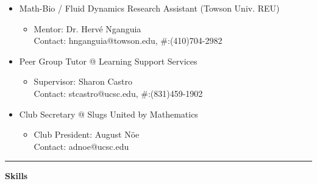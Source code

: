 \documentclass{article}
\begin{document}
{\begin{small}
\begin{itemize}[label = \textcolor{bullets}{}]
    \item{\normalsize Math-Bio / Fluid Dynamics Research Assistant (Towson Univ. REU)}
    \begin{itemize}[label = \textcolor{bullets}{}]
        \item{Mentor: Dr. Herv\'e Nganguia\\ Contact: hnganguia@towson.edu, \#:(410)704-2982}
    \end{itemize}
    \item{\normalsize Peer Group Tutor @ Learning Support Services}
    \begin{itemize}[label = \textcolor{bullets}{}]
        \item{Supervisor: Sharon Castro\\ Contact: stcastro@ucsc.edu, \#:(831)459-1902}
    \end{itemize}
    \begin{comment}
        \item{\normalsize UCSC Fleet Services}
    \begin{itemize}[label = \textcolor{bullets}{\ding{104}}]
        \item{Supervisor: Christa Mercado\\ Contact: cnmercad@ucsc.edu, \#:(831)459-2228}
    \end{itemize}
    \end{comment}
    \item{\normalsize Club Secretary @ Slugs United by Mathematics}
        \begin{itemize}[label = \textcolor{bullets}{}]
            \item{Club President: August N\"{o}e\\ Contact: adnoe@ucsc.edu}
        \end{itemize}
\end{itemize}
\end{small}
\noindent\textcolor{lines}{\rule{\textwidth}{1pt}}\par
\vspace{10pt}
\bf{\Large Skills}
}
\vspace{6pt}
\end{document}
